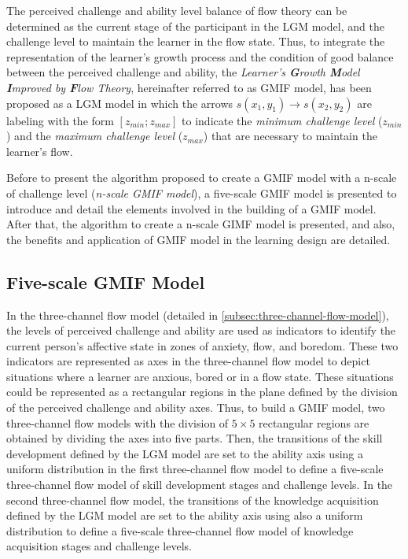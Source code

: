 The perceived challenge and ability level balance of flow theory can be determined as the current stage of the participant in the LGM model, and the challenge level to maintain the learner in the flow state. Thus, to integrate the representation of the learner’s growth process and the condition of good balance between the perceived challenge and ability, the \emph{Learner’s \textbf{G}rowth \textbf{M}odel \textbf{I}mproved by \textbf{F}low Theory}, hereinafter referred to as GMIF model, has been proposed as a LGM model in which the arrows $s(x_{1},y_{1}) \to s(x_{2},y_{2})$ are labeling with the form $[z_{min}; z_{max}]$ to indicate the \emph{minimum challenge level} ($z_{min}$) and the \emph{maximum challenge level} ($z_{max}$) that are necessary to maintain the learner's flow.

Before to present the algorithm proposed to create a GMIF model with a n-scale of challenge level (\emph{n-scale GMIF model}), a five-scale GMIF model is presented to introduce and detail the elements involved in the building of a GMIF model. After that, the algorithm to create a n-scale GIMF model is presented, and also, the benefits and application of GMIF model in the learning design are detailed.

\subsection{Five-scale GMIF Model}
\label{subsec:five-scale-gmif-model}

In the three-channel flow model (detailed in \autoref{subsec:three-channel-flow-model}), the levels of perceived challenge and ability are used as indicators to identify the current person's affective state in zones of anxiety, flow, and boredom. These two indicators are represented as axes in the three-channel flow model to depict situations where a learner are anxious, bored or in a flow state. These situations could be represented as a rectangular regions in the plane defined by the division of the perceived challenge and ability axes. Thus, to build a GMIF model, two three-channel flow models with the division of $5 \times 5$ rectangular regions are obtained by dividing the axes into five parts. Then, the transitions of the skill development defined by the LGM model are set to the ability axis using a uniform distribution in the first three-channel flow model to define a five-scale three-channel flow model of skill development stages and challenge levels. In the second three-channel flow model, the transitions of the knowledge acquisition defined by the LGM model are set to the ability axis using also a uniform distribution to define a five-scale three-channel flow model of knowledge acquisition stages and challenge levels.

